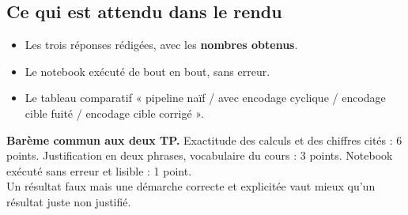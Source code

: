 \documentclass[10pt,a4paper]{article}
\begin{document}
\subsection*{Ce qui est attendu dans le rendu}
\begin{itemize}
  \item Les trois réponses rédigées, avec les \textbf{nombres obtenus}.
  \item Le notebook exécuté de bout en bout, sans erreur.
  \item Le tableau comparatif « pipeline naïf / avec encodage cyclique /
        encodage cible fuité / encodage cible corrigé ».
\end{itemize}

\vspace{2mm}
\begin{note}
\textbf{Barème commun aux deux TP.}
Exactitude des calculs et des chiffres cités : 6 points.
Justification en deux phrases, vocabulaire du cours : 3 points.
Notebook exécuté sans erreur et lisible : 1 point.\\[2pt]
Un résultat faux mais une démarche correcte et explicitée vaut mieux qu'un
résultat juste non justifié.
\end{note}
\end{document}
